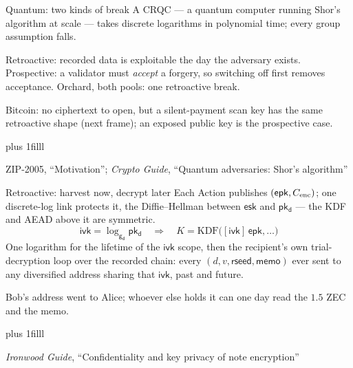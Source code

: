 \documentclass[aspectratio=169,11pt]{beamer}
\newcommand{\gd}{\ensuremath{\mathsf{g_d}}}
\newcommand{\pkd}{\ensuremath{\mathsf{pk_d}}}
\newcommand{\ivk}{\ensuremath{\mathsf{ivk}}}
\newcommand{\esk}{\ensuremath{\mathsf{esk}}}
\newcommand{\epk}{\ensuremath{\mathsf{epk}}}
\newcommand{\src}[1]{\par\vskip0pt plus 1filll
  {\fontsize{6}{7.2}\selectfont\color{arbdim}\raggedright #1\par}}
\begin{document}
\begin{frame}{Quantum: two kinds of break}
A CRQC --- a quantum computer running Shor's algorithm at scale --- takes
discrete logarithms in polynomial time; every group assumption falls.
\begin{center}
\end{center}
Retroactive: recorded data is exploitable the day the adversary exists.
Prospective: a validator must \emph{accept} a forgery, so switching off
first removes acceptance. Orchard, both pools: one retroactive break.

\alert{Bitcoin:} no ciphertext to open, but a silent-payment scan key has
the same retroactive shape (next frame); an exposed public key is the
prospective case.
\src{ZIP-2005, ``Motivation''; \emph{Crypto Guide}, ``Quantum adversaries: Shor's algorithm''}
\end{frame}

\begin{frame}{Retroactive: harvest now, decrypt later}
Each Action publishes $(\epk, \Cenc)$; one discrete-log link
protects it, the Diffie--Hellman between \esk{} and \pkd{} --- the KDF
and AEAD above it are symmetric.
\[
\ivk = \log_{\gd}\pkd
\quad\Longrightarrow\quad
K = \mathrm{KDF}\bigl([\ivk]\,\epk, \ldots\bigr)
\]
One logarithm for the lifetime of the \ivk{} scope, then the recipient's
own trial-decryption loop over the recorded chain: every $(d, v,
\mathsf{rseed}, \mathsf{memo})$ ever sent to any diversified address
sharing that \ivk, past and future.

\medskip
Bob's address went to Alice; whoever else holds it can one day read the
$1.5$ ZEC and the memo.
\src{\emph{Ironwood Guide}, ``Confidentiality and key privacy of note
  encryption''}
\end{frame}
\end{document}
